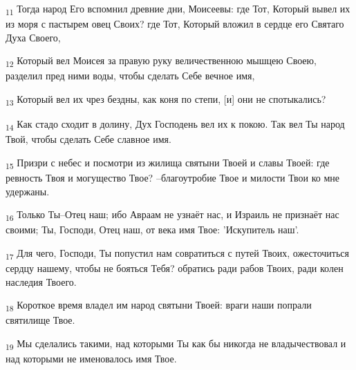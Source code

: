 \begin{tcolorbox}
\textsubscript{11} Тогда народ Его вспомнил древние дни, Моисеевы: где Тот, Который вывел их из моря с пастырем овец Своих? где Тот, Который вложил в сердце его Святаго Духа Своего,
\end{tcolorbox}
\begin{tcolorbox}
\textsubscript{12} Который вел Моисея за правую руку величественною мышцею Своею, разделил пред ними воды, чтобы сделать Себе вечное имя,
\end{tcolorbox}
\begin{tcolorbox}
\textsubscript{13} Который вел их чрез бездны, как коня по степи, [и] они не спотыкались?
\end{tcolorbox}
\begin{tcolorbox}
\textsubscript{14} Как стадо сходит в долину, Дух Господень вел их к покою. Так вел Ты народ Твой, чтобы сделать Себе славное имя.
\end{tcolorbox}
\begin{tcolorbox}
\textsubscript{15} Призри с небес и посмотри из жилища святыни Твоей и славы Твоей: где ревность Твоя и могущество Твое? --благоутробие Твое и милости Твои ко мне удержаны.
\end{tcolorbox}
\begin{tcolorbox}
\textsubscript{16} Только Ты--Отец наш; ибо Авраам не узнаёт нас, и Израиль не признаёт нас своими; Ты, Господи, Отец наш, от века имя Твое: 'Искупитель наш'.
\end{tcolorbox}
\begin{tcolorbox}
\textsubscript{17} Для чего, Господи, Ты попустил нам совратиться с путей Твоих, ожесточиться сердцу нашему, чтобы не бояться Тебя? обратись ради рабов Твоих, ради колен наследия Твоего.
\end{tcolorbox}
\begin{tcolorbox}
\textsubscript{18} Короткое время владел им народ святыни Твоей: враги наши попрали святилище Твое.
\end{tcolorbox}
\begin{tcolorbox}
\textsubscript{19} Мы сделались такими, над которыми Ты как бы никогда не владычествовал и над которыми не именовалось имя Твое.
\end{tcolorbox}
